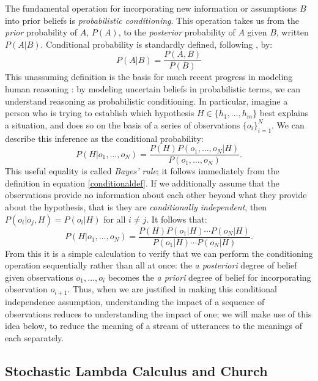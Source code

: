 \documentclass[pdfextras]{handbook}
\begin{document}

The fundamental operation for incorporating new information or assumptions $B$ into prior beliefs is \emph{probabilistic conditioning}. 
This operation takes us from the \emph{prior} probability of $A$, $P(A)$, to the \emph{posterior} probability of $A$ given $B$, written $P(A|B)$. 
Conditional probability is standardly defined, following \citet{kolmogorov33}, by:
\begin{equation}
\label{conditionaldef}
P(A|B) = \frac{P(A,B)}{P(B)} 
\end{equation}
This unassuming definition is the basis for much recent progress in modeling human reasoning \cite[e.g.][]{tenenbaum2011}: by modeling uncertain beliefs in probabilistic terms, we can understand reasoning as probabilistic conditioning. 
In particular, imagine a person who is trying to establish which hypothesis $H\in\{h_1,\dots,h_m\}$ best explains a situation, and does so on the basis of a series of observations $\{o_i\}_{i=1}^N$. 
We can describe this inference as the conditional probability:
\begin{equation}
P(H|o_1,\dots,o_N) = \frac{P(H)P(o_1,\dots,o_N|H)}{P(o_1,\dots,o_N)}.
\end{equation}
This useful equality is called \emph{Bayes' rule}; it follows immediately from the definition in equation \ref{conditionaldef}. 
If we additionally assume that the observations provide no information about each other beyond what they provide about the hypothesis, that is they are \emph{conditionally independent}, then $P(o_i|o_j, H)=P(o_i|H)$ for all $i\neq j$. 
It follows that:
\begin{equation}
P(H|o_1,\dots,o_N) = \frac{P(H)P(o_1|H)\cdots P(o_N|H)}{P(o_1|H)\cdots P(o_N|H)}.
\end{equation}
From this it is a simple calculation to verify that we can perform the conditioning operation sequentially rather than all at once: the \emph{a posteriori} degree of belief given observations $o_1,\dots,o_i$ becomes the \emph{a priori} degree of belief for incorporating observation $o_{i+1}$. Thus, when we are justified in making this conditional independence assumption, understanding the impact of a sequence of observations reduces to understanding the impact of one; we will make use of this idea below, to reduce the meaning of a stream of utterances to the meanings of each separately.


\subsection{Stochastic Lambda Calculus and Church}
\end{document}
